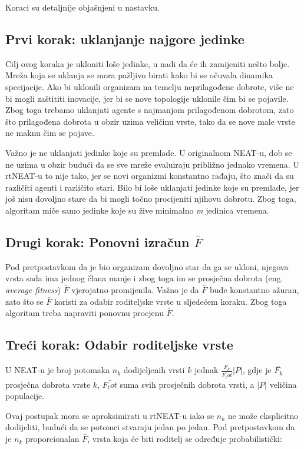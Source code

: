 \documentclass[times, utf8, seminar, numeric]{fer}
\begin{document}
Koraci su detaljnije objašnjeni u nastavku.

\subsection{Prvi korak: uklanjanje najgore jedinke}
Cilj ovog koraka je ukloniti loše jedinke, u nadi da će ih zamijeniti nešto bolje. Mreža koja se uklanja se mora pažljivo birati kako bi se očuvala dinamika specijacije. Ako bi uklonili organizam na temelju neprilagođene dobrote, više ne bi mogli zaštititi inovacije, jer bi se nove topologije uklonile čim bi se pojavile. Zbog toga trebamo uklanjati agente s najmanjom prilagođenom dobrotom, zato što prilagođena dobrota u obzir uzima veličinu vrste, tako da se nove male vrste ne maknu čim se pojave.

Važno je ne uklanjati jedinke koje su premlade. U originalnom NEAT-u, dob se ne uzima u obzir budući da se sve mreže evaluiraju približno jednako vremena. U rtNEAT-u to nije tako, jer se novi organizmi konstantno rađaju, što znači da su različiti agenti i različito stari. Bilo bi loše uklanjati jedinke koje su premlade, jer još nisu dovoljno stare da bi mogli točno procijeniti njihovu dobrotu. Zbog toga, algoritam miče samo jedinke koje su žive minimalno \textit{m} jedinica vremena.

\subsection{Drugi korak: Ponovni izračun $\bar{F}$}
Pod pretpostavkom da je bio organizam dovoljno star da ga se ukloni, njegova vrsta sada ima jednog člana manje i zbog toga im se prosječna dobrota (eng. \textit{average fitness}) $\bar{F}$ vjerojatno promijenila. Važno je da $\bar{F}$ bude konstantno ažuran, zato što se $\bar{F}$ koristi za odabir roditeljske vrste u sljedećem koraku. Zbog toga algoritam treba napraviti ponovnu procjenu $\bar{F}$.

\subsection{Treći korak: Odabir roditeljske vrste}
U NEAT-u je broj potomaka $n_k$ dodijeljenih vrsti $k$ jednak $\frac{\bar{F_k}}{\bar{F_tot}}|P|$, gdje je $\bar{F_k}$ prosječna dobrota vrste $k$, $\bar{F_tot}$ suma svih prosječnih dobrota vrsti, a $|P|$ veličina populacije.

Ovaj postupak mora se aproksimirati u rtNEAT-u iako se $n_k$ ne može eksplicitno dodijeliti, budući da se potomci stvaraju jedan po jedan. Pod pretpostavkom da je $n_k$ proporcionalan $\bar{F}$, vrsta koja će biti roditelj se određuje probabilistički:
\end{document}
